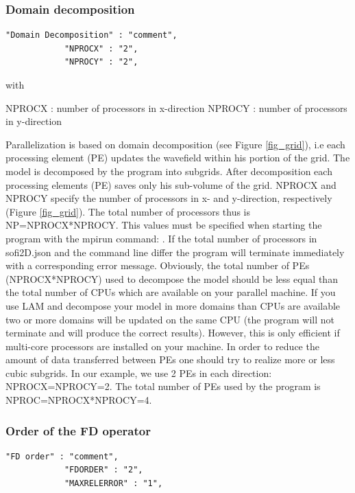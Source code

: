 \documentclass[11pt,onecolumn,oneside]{article}
\begin{document}
\subsubsection{Domain decomposition}

\begin{verbatim}
"Domain Decomposition" : "comment",
			"NPROCX" : "2",
			"NPROCY" : "2",
\end{verbatim}

with

NPROCX : number of processors in x-direction \newline
NPROCY : number of processors in y-direction

Parallelization is based on domain decomposition (see Figure \ref{fig_grid}), i.e each processing element (PE) updates the wavefield within his portion of the grid. The model is  decomposed by the program into subgrids. After decomposition each processing elements (PE) saves only his sub-volume of the grid. NPROCX and NPROCY specify the number of processors in x- and y-direction, respectively (Figure  \ref{fig_grid}). The total number of processors thus is NP=NPROCX*NPROCY. This values must be specified when starting the program with the mpirun command: . If the total number of processors in sofi2D.json and the command line differ the program will terminate immediately with a corresponding error message. Obviously, the total number of PEs (NPROCX*NPROCY) used to decompose the model should be less equal than the total number of CPUs which are available on your parallel machine. If you use LAM and decompose your model in more
domains than CPUs are available two or more  domains will be updated on the same CPU (the program will not terminate and will produce the correct results). However, this is only efficient if multi-core processors are installed on your machine. In order to reduce the amount of data transferred between PEs one should try to realize more or less cubic subgrids. In our example, we use 2 PEs in each direction: NPROCX=NPROCY=2. The total number of PEs used by the program is NPROC=NPROCX*NPROCY=4. 

\subsubsection{Order of the FD operator}

\begin{verbatim}
"FD order" : "comment",
			"FDORDER" : "2",
			"MAXRELERROR" : "1",
\end{verbatim}
\end{document}

